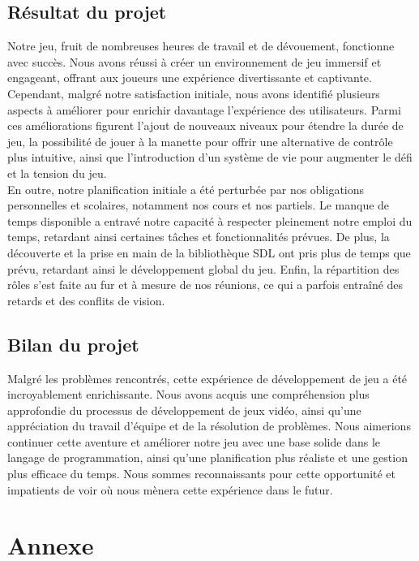 \documentclass[12pt,a4paper]{article}
\begin{document}
        \subsection{Résultat du projet}
            \tabto{1cm} Notre jeu, fruit de nombreuses heures de travail et de dévouement, fonctionne avec succès. Nous avons réussi à créer un environnement de jeu immersif et engageant, offrant aux joueurs une expérience divertissante et captivante. Cependant, malgré notre satisfaction initiale, nous avons identifié plusieurs aspects à améliorer pour enrichir davantage l'expérience des utilisateurs. Parmi ces améliorations figurent l'ajout de nouveaux niveaux pour étendre la durée de jeu, la possibilité de jouer à la manette pour offrir une alternative de contrôle plus intuitive, ainsi que l'introduction d'un système de vie pour augmenter le défi et la tension du jeu.\\
            
            En outre, notre planification initiale a été perturbée par nos obligations personnelles et scolaires, notamment nos cours et nos partiels. Le manque de temps disponible a entravé notre capacité à respecter pleinement notre emploi du temps, retardant ainsi certaines tâches et fonctionnalités prévues. De plus, la découverte et la prise en main de la bibliothèque SDL ont pris plus de temps que prévu, retardant ainsi le développement global du jeu. Enfin, la répartition des rôles s'est faite au fur et à mesure de nos réunions, ce qui a parfois entraîné des retards et des conflits de vision.\\

        \subsection{Bilan du projet}
            \tabto{1cm} Malgré les problèmes rencontrés, cette expérience de développement de jeu a été incroyablement enrichissante. Nous avons acquis une compréhension plus approfondie du processus de développement de jeux vidéo, ainsi qu'une appréciation du travail d'équipe et de la résolution de problèmes. Nous aimerions continuer cette aventure et améliorer notre jeu avec une base solide dans le langage de programmation, ainsi qu'une planification plus réaliste et une gestion plus efficace du temps. Nous sommes reconnaissants pour cette opportunité et impatients de voir où nous mènera cette expérience dans le futur.

    \section{Annexe}
\end{document}
